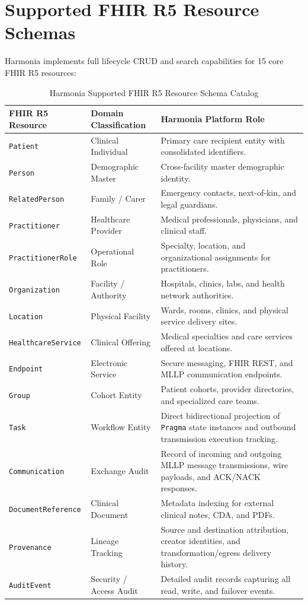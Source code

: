 \section{Supported FHIR R5 Resource Schemas}

Harmonia implements full lifecycle CRUD and search capabilities for 15 core FHIR R5 resources:

\begin{table}[htbp]
\centering
\small
\begin{tabularx}{\textwidth}{l p{4.0cm} X}
\toprule
\textbf{FHIR R5 Resource} & \textbf{Domain Classification} & \textbf{Harmonia Platform Role} \\
\midrule
\texttt{Patient} & Clinical Individual & Primary care recipient entity with consolidated identifiers. \\
\texttt{Person} & Demographic Master & Cross-facility master demographic identity. \\
\texttt{RelatedPerson} & Family / Carer & Emergency contacts, next-of-kin, and legal guardians. \\
\texttt{Practitioner} & Healthcare Provider & Medical professionals, physicians, and clinical staff. \\
\texttt{PractitionerRole} & Operational Role & Specialty, location, and organizational assignments for practitioners. \\
\texttt{Organization} & Facility / Authority & Hospitals, clinics, labs, and health network authorities. \\
\texttt{Location} & Physical Facility & Wards, rooms, clinics, and physical service delivery sites. \\
\texttt{HealthcareService} & Clinical Offering & Medical specialties and care services offered at locations. \\
\texttt{Endpoint} & Electronic Service & Secure messaging, FHIR REST, and MLLP communication endpoints. \\
\texttt{Group} & Cohort Entity & Patient cohorts, provider directories, and specialized care teams. \\
\texttt{Task} & Workflow Entity & Direct bidirectional projection of \texttt{Pragma} state instances and outbound transmission execution tracking. \\
\texttt{Communication} & Exchange Audit & Record of incoming and outgoing MLLP message transmissions, wire payloads, and ACK/NACK responses. \\
\texttt{DocumentReference} & Clinical Document & Metadata indexing for external clinical notes, CDA, and PDFs. \\
\texttt{Provenance} & Lineage Tracking & Source and destination attribution, creator identities, and transformation/egress delivery history. \\
\texttt{AuditEvent} & Security / Access Audit & Detailed audit records capturing all read, write, and failover events. \\
\bottomrule
\end{tabularx}
\caption{Harmonia Supported FHIR R5 Resource Schema Catalog}
\label{tab:fhir_resources}
\end{table}

